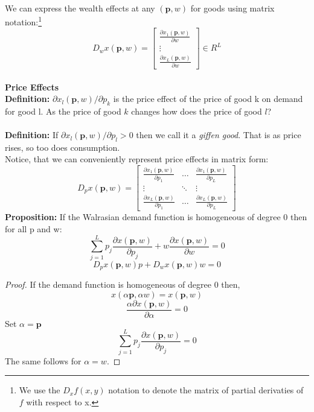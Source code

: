 \documentclass[12pt]{article}
\let\bf\oldbf
\let\bf\textbf
\begin{document}
\\ We can express the wealth effects at any $(\bf{p}, w)$ for goods using matrix notation:\footnote{We use the $D_xf(x,y)$ notation to denote the matrix of partial derivaties of $f$ with respect to x.}
$$D_wx(\bf{p}, w) = \begin{bmatrix} 
\frac{\partial x_1(\bf{p},w)}{\partial w} \\
\vdots \\
\frac{\partial x_L(\bf{p},w)}{\partial w} 
\end{bmatrix} \in R^L$$
\\ \bf{Price Effects}
\\ \bf{Definition:} $\partial x_l(\bf{p}, w)/\partial p_k$ is the price effect of the price of good k on demand for good l. As the price of good $k$ changes how does the price of good $l$?
\\ \bf{\\Definition:} If $\partial x_l(\bf{p}, w)/\partial p_l > 0$ then we call it a \emph{giffen good}. That is as price rises, so too does consumption.
\\ Notice, that we can conveniently represent price effects in matrix form:
$$D_p x(\bf{p}, w) = \begin{bmatrix} 
\frac{\partial x_1(\bf{p}, w)}{\partial p_1} & \dots & \frac{\partial x_1(\bf{p}, w)}{\partial p_L}\\
 \vdots & \ddots & \vdots \\
\frac{\partial x_L(\bf{p}, w)}{\partial p_1} & \dots & \frac{\partial x_L(\bf{p}, w)}{\partial p_L} 
\end{bmatrix}$$
\bf{Proposition:} If the Walrasian demand function is homogeneous of degree 0 then for all p and w: 
$$\sum^L_{j=1} p_j \frac{\partial x(\bf{p}, w)}{\partial p_j} + w\frac{\partial x(\bf{p}, w)}{\partial w} = 0$$
$$D_px(\bf{p}, w)p + D_wx(\bf{p}, w)w = 0$$

\begin{proof}
If the demand function is homogeneous of degree 0 then,
$$x(\alpha\bf{p}, \alpha w) = x(\bf{p}, w)$$
$$\frac{\alpha \partial x(\bf{p}, w)}{\partial\alpha} = 0$$
Set $\alpha = \bf{p}$
$$\sum^L_{j=1} p_j \frac{\partial x(\bf{p}, w)}{\partial p_j} = 0$$
The same follows for $\alpha = w$.
\end{proof}
\end{document}
